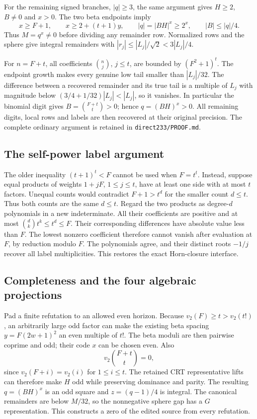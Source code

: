 \documentclass[10pt,letterpaper]{article}
\theoremstyle{remark}\newtheorem{remark}[theorem]{Remark}
\begin{document}
For the remaining signed branches, $|q|\ge3$, the same argument gives
$H\ge2$, $B\ne0$ and $x>0$. The two beta endpoints imply
\[
 x\ge F+1,\qquad x\ge2+(t+1)y,\qquad
 |q|=|BH|^x\ge2^x,\qquad |B|\le |q|/4.
\]
Thus $M=q^x\ne0$ before dividing any remainder row. Normalized rows and
the sphere give integral remainders with
$|r_j|\le|L_j|/\sqrt2<3|L_j|/4$.

For $n=F+t$, all coefficients $\binom nj$, $j\le t$, are bounded by
$(F^2+1)^t$. The endpoint growth makes every genuine low tail smaller
than $|L_j|/32$. The difference between a recovered remainder and its
true tail is a multiple of $L_j$ with magnitude below
$(3/4+1/32)|L_j|<|L_j|$, so it vanishes. In particular the binomial
digit gives $B=\binom{F+t}{t}>0$; hence $q=(BH)^x>0$.
All remaining digits, local rows and labels are then recovered at their
original precision. The complete ordinary argument is retained in
\texttt{direct233/PROOF.md}.

\subsection{The self-power label argument}

The older inequality $(t+1)^t<F$ cannot be used when $F=t^t$.
Instead, suppose equal products of weights $1+jF$, $1\le j\le t$,
have at least one side with at most $t$ factors. Unequal counts would
contradict $F+1>t^d$ for the smaller count $d\le t$. Thus both counts
are the same $d\le t$. Regard the two products as degree-$d$ polynomials
in a new indeterminate. All their coefficients are positive and at most
$\binom dk t^k\le t^d\le F$. Their corresponding differences have
absolute value less than $F$. The lowest nonzero coefficient therefore
cannot vanish after evaluation at $F$, by reduction modulo $F$.
The polynomials agree, and their distinct roots $-1/j$ recover all
label multiplicities. This restores the exact Horn-closure interface.

\subsection{Completeness and the four algebraic projections}

Pad a finite refutation to an allowed even horizon. Because
$v_2(F)\ge t>v_2(t!)$, an arbitrarily large odd factor can make the
existing beta spacing $y=F(2w+1)^2$ an even multiple of $t!$.
The beta moduli are then pairwise coprime and odd; their code $x$ can
be chosen even. Also
\[
 v_2\binom{F+t}{t}=0,
\]
since $v_2(F+i)=v_2(i)$ for $1\le i\le t$. The retained CRT
representative lifts can therefore make $H$ odd while preserving
dominance and parity. The resulting $q=(BH)^x$ is an odd square and
$z=(q-1)/4$ is integral. The canonical remainders are below $M/32$,
so the nonnegative sphere gap has a $G$ representation. This constructs
a zero of the edited source from every refutation.
\end{document}
